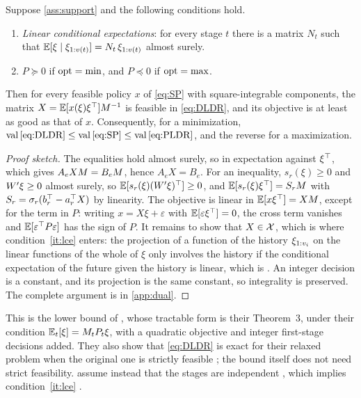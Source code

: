 \begin{theorem}
\label{thm:dual-bound}
Suppose \cref{ass:support} and the following conditions hold.
\begin{enumerate}[label=(\roman*)]
\item\label{it:lce} \emph{Linear conditional expectations}: for every stage $t$ there is a matrix $N_t$ such that
$\mathbb{E}[\xi \mid \xi_{1:v(t)}] = N_t\, \xi_{1:v(t)}$ almost surely.
\item\label{it:convex} $P \succeq 0$ if $\operatorname{opt} = \min$, and $P \preceq 0$ if $\operatorname{opt} = \max$.
\end{enumerate}
Then for every feasible policy $x$ of \eqref{eq:SP} with square-integrable components, the matrix $X = \mathbb{E}[x(\xi)\xi^\top]M^{-1}$ is feasible in \eqref{eq:DLDR},
and its objective is at least as good as that of $x$.
Consequently, for a minimization, $\operatorname{val}\eqref{eq:DLDR} \le \operatorname{val}\eqref{eq:SP} \le \operatorname{val}\eqref{eq:PLDR}$, and the reverse for a maximization.
\end{theorem}

\begin{proof}[Proof sketch]
The equalities hold almost surely, so in expectation against $\xi^\top$, which gives $A_eXM = B_eM$, hence $A_eX = B_e$.
For an inequality, $s_r(\xi) \ge 0$ and $W'\xi \ge 0$ almost surely, so $\mathbb{E}[s_r(\xi)(W'\xi)^\top] \ge 0$,
and $\mathbb{E}[s_r(\xi)\xi^\top] = S_rM$ with $S_r = \sigma_r(b_r^\top - a_r^\top X)$ by linearity.
The objective is linear in $\mathbb{E}[x\xi^\top] = XM$, except for the term in $P$:
writing $x = X\xi + \varepsilon$ with $\mathbb{E}[\varepsilon\xi^\top] = 0$, the cross term vanishes and $\mathbb{E}[\varepsilon^\top P \varepsilon]$ has the sign of $P$.
It remains to show that $X \in \mathcal{X}$, which is where condition~\ref{it:lce} enters:
the projection of a function of the history $\xi_{1:v_i}$ on the linear functions of the whole of $\xi$ only involves the history if the conditional expectation of the future given the history is linear,
which is \citet[Lemma~2]{KWG2011}.
An integer decision is a constant, and its projection is the same constant, so integrality is preserved.
The complete argument is in \cref{app:dual}.
\end{proof}

This is the lower bound of \citet[Section~4]{KWG2011}, whose tractable form is their Theorem~3, under their condition $\mathbb{E}_t[\xi] = M_tP_t\xi$,
with a quadratic objective and integer first-stage decisions added.
They also show that \eqref{eq:DLDR} is exact for their relaxed problem when the original one is strictly feasible \citep[Proposition~4]{KWG2011};
the bound itself does not need strict feasibility.
\citet{GWK2015} assume instead that the stages are independent \citep[condition (M4)]{GWK2015},
which implies condition~\ref{it:lce} \citep[footnote~3]{KWG2011}.

